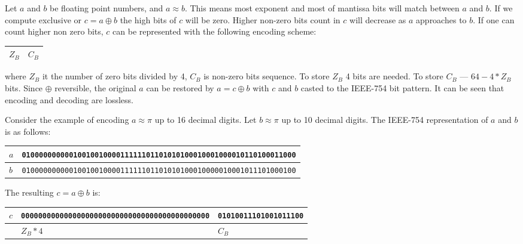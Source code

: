 \documentclass[lettersize,journal]{IEEEtran}
\begin{document}
Let \(a\) and \(b\) be floating point numbers, and \(a\approx b\). This means most exponent and most of mantissa 
bits will match between \(a\) and \(b\). If we compute exclusive or \(c=a \oplus b\) the high bits of \(c\) will
be zero. Higher non-zero bits count in \(c\) will decrease as \(a\) approaches to \(b\). If one can count
higher non zero bits, \(c\) can be represented with the following encoding scheme:

\begin{table}[!h]
	\centering
	\begin{tabularx}{0.2\columnwidth}{ 
			| >{\centering\arraybackslash}X 
			| >{\centering\arraybackslash}X |}
		\hline
		\(Z_B\) & \(C_B\)\\
		\hline
	\end{tabularx}
\end{table}

\noindent where \(Z_B\) it the number of zero bits divided by 4, \(C_B\) is non-zero bits sequence.
To store \(Z_B\) 4 bits are needed. To store \(C_B\) --- \(64 - 4*Z_B\) bits. 
Since \(\oplus\) reversible, the original \(a\) can be restored by \(a = c \oplus b\) with \(c\)
and \(b\) casted to the IEEE-754 bit pattern. It can be seen that encoding and decoding are lossless.

Consider the example of encoding \(a \approx \pi\) up to 16 decimal digits. Let \(b\approx \pi\) 
up to 10 decimal digits. The IEEE-754 representation of \(a\) and \(b\) is as follows:

\begin{table}[!h]
	\centering
	\fontsize{5.5}{1.2} {
	\begin{tabularx}{\columnwidth}{ 
			| >{\raggedleft\arraybackslash}l 
			| >{\raggedright\arraybackslash}X |}
		\hline
		 \(a\) & \texttt{0100000000001001001000011111101101010100010001000010110100011000} \\
		\hline
		\(b\) & \texttt{0100000000001001001000011111101101010100010000010001011101000100} \\
		\hline
	\end{tabularx}
}
\end{table}

The resulting \(c=a \oplus b\) is:

\begin{table}[!h]
	\centering
	\fontsize{5.5}{1.2} {
		\begin{tabularx}{\columnwidth}{ 
				| >{\raggedleft\arraybackslash}l 
				| >{\raggedright\arraybackslash}l 
 			    | >{\raggedright\arraybackslash}X |}
			\hline
			\(c\) & \texttt{00000000000000000000000000000000000000000000} & \texttt{01010011101001011100} \\
			\hline
		    & \multicolumn{1}{c|} {\(Z_B * 4\)} & \multicolumn{1}{c|} {\(C_B\)} \\ 
			\hline
		\end{tabularx}
	}
\end{table}
\end{document}
